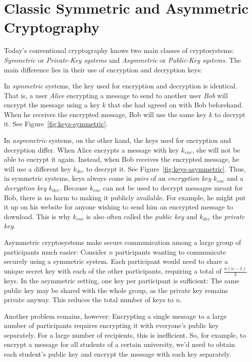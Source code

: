 \section{Classic Symmetric and Asymmetric Cryptography}
Today's conventional cryptography knows two main classes of cryptosystems: \emph{Symmetric} or \emph{Private-Key systems} and \emph{Asymmetric} or \emph{Public-Key systems}.
The main difference lies in their use of encryption and decryption keys:

In \emph{symmetric} systems, the key used for encryption and decryption is identical.
That is, a user \emph{Alice} encrypting a message to send to another user \emph{Bob} will encrypt the message using a key $k$ that she had agreed on with Bob beforehand.
When he receives the encrypted message, Bob will use the same key $k$ to decrypt it. See Figure~\ref{fig:keys-symmetric}.

In \emph{asymmetric} systems, on the other hand, the keys used for encryption and decryption differ.
When Alice encrypts a message with key $k_{enc}$, she will not be able to encrypt it again.
Instead, when Bob receives the encrypted message, he will use a different key $k_{dec}$ to decrypt it. See Figure~\ref{fig:keys-asymmetric}.
Thus, in symmetric systems, keys always come in \emph{pairs} of an \emph{encryption key} $k_{enc}$ and a \emph{decryption key} $k_{dec}$.
Because $k_{enc}$ can not be used to decrypt messages meant for Bob, there is no harm to making it publicly available.
For example, he might put it up on his website for anyone wishing to send him an encrypted message to download. This is why $k_{enc}$ is also often called the \emph{public key} and $k_{dec}$ the \emph{private key}.

Asymmetric cryptosystems make secure communication among a large group of participants much easier:
Consider $n$ participants wanting to communicate securely using a symmetric system.
Each participant would need to share a unique secret key with each of the other participants, requiring a total of $\frac{n(n-1)}{2}$ keys. In the asymmetric setting, one key per participant is sufficient:
The same public key may be shared with the whole group, as the private key remains private anyway. This reduces the total number of keys to $n$.

Another problem remains, however: Encrypting a single message to a large number of participants requires encrypting it with everyone's public key separately.
For a large number of recipients, this is inefficient.
So, for example, to encrypt a message for all students of a certain university, we'd need to obtain each student's public key and encrypt the message with each key separately.

